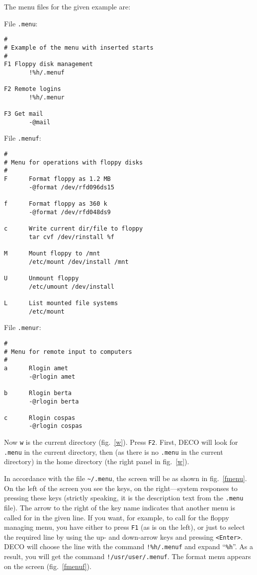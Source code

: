 The menu files for the given example are:

File {\tt .menu}:
\begin{source}
\begin{verbatim}
#
# Example of the menu with inserted starts
#
F1 Floppy disk management
       !%h/.menuf

F2 Remote logins
       !%h/.menur

F3 Get mail
       -@mail
\end{verbatim}
\end{source}

File {\tt .menuf}:
\begin{source}
\begin{verbatim}
#
# Menu for operations with floppy disks
#
F      Format floppy as 1.2 MB
       -@format /dev/rfd096ds15

f      Format floppy as 360 k
       -@format /dev/rfd048ds9

c      Write current dir/file to floppy
       tar cvf /dev/rinstall %f

M      Mount floppy to /mnt
       /etc/mount /dev/install /mnt

U      Unmount floppy
       /etc/umount /dev/install

L      List mounted file systems
       /etc/mount
\end{verbatim}
\end{source}

File {\tt .menur}:
\begin{source}
\begin{verbatim}
#
# Menu for remote input to computers
#
a      Rlogin amet
       -@rlogin amet

b      Rlogin berta
       -@rlogin berta

c      Rlogin cospas
       -@rlogin cospas
\end{verbatim}
\end{source}

Now {\tt w} is the current directory (fig.~\ref{w}). Press {\tt F2}. First,
DECO will look for {\tt .menu} in the current directory, then
(as there is no {\tt .menu} in the current directory) in the
home directory (the right panel in fig.~\ref{w}).
 


In accordance with the file {\tt \~{}/.menu}, the screen will be as shown
in fig.~\ref{fmenu}. On the left of the screen you see the keys, on the
right---system responses to pressing these keys (strictly speaking, it
is the description text from the {\tt .menu} file). The arrow to the right of
the key name indicates that another menu is called for in the given line.
If you want, for example, to call for the floppy managing menu, you have
either to press {\tt F1} (as is on the left), or just to select the required
line by using the up- and down-arrow keys and pressing {\tt <Enter>}. DECO will
choose the line with the command {\tt !\%h/.menuf} and expand ``{\tt \%h}''.
As a result, you will get the command {\tt !/usr/user/.menuf}.
The format menu appears on the screen (fig.~\ref{fmenuf}).

